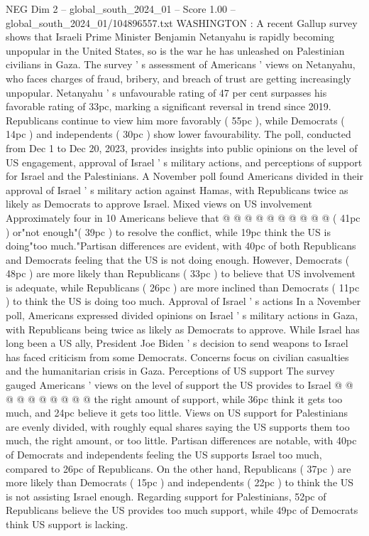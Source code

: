 \begin{textsample}{NEG Dim 2 – global\_south\_2024\_01 – Score 1.00 – global\_south\_2024\_01/104896557.txt}  \label{ex:f2_neg_345}
WASHINGTON : A recent Gallup survey shows that Israeli Prime Minister Benjamin Netanyahu is rapidly becoming unpopular in the United States, so is the war he has unleashed on Palestinian civilians in Gaza.
The survey ' s assessment of Americans ' views on Netanyahu, who faces charges of fraud, bribery, and breach of trust are getting increasingly unpopular.
Netanyahu ' s unfavourable rating of 47 per cent surpasses his favorable rating of 33pc, marking a significant reversal in trend since 2019.
Republicans continue to view him more favorably ( 55pc ), while Democrats ( 14pc ) and independents ( 30pc ) show lower favourability.
The poll, conducted from Dec 1 to Dec 20, 2023, provides insights into public opinions on the level of US engagement, approval of Israel ' s military actions, and perceptions of support for Israel and the Palestinians.
A November poll found Americans divided in their approval of Israel ' s military action against Hamas, with Republicans twice as likely as Democrats to approve Israel.
Mixed views on US involvement Approximately four in 10 Americans believe that @ @ @ @ @ @ @ @ @ @ ( 41pc ) or"not enough"( 39pc ) to resolve the conflict, while 19pc think the US is doing"too much."Partisan differences are evident, with 40pc of both Republicans and Democrats feeling that the US is not doing enough.
However, Democrats ( 48pc ) are more likely than Republicans ( 33pc ) to believe that US involvement is adequate, while Republicans ( 26pc ) are more inclined than Democrats ( 11pc ) to think the US is doing too much.
Approval of Israel ' s actions In a November poll, Americans expressed divided opinions on Israel ' s military actions in Gaza, with Republicans being twice as likely as Democrats to approve.
While Israel has long been a US ally, President Joe Biden ' s decision to send weapons to Israel has faced criticism from some Democrats.
Concerns focus on civilian casualties and the humanitarian crisis in Gaza.
Perceptions of US support The survey gauged Americans ' views on the level of support the US provides to Israel @ @ @ @ @ @ @ @ @ @ the right amount of support, while 36pc think it gets too much, and 24pc believe it gets too little.
Views on US support for Palestinians are evenly divided, with roughly equal shares saying the US supports them too much, the right amount, or too little.
Partisan differences are notable, with 40pc of Democrats and independents feeling the US supports Israel too much, compared to 26pc of Republicans.
On the other hand, Republicans ( 37pc ) are more likely than Democrats ( 15pc ) and independents ( 22pc ) to think the US is not assisting Israel enough.
Regarding support for Palestinians, 52pc of Republicans believe the US provides too much support, while 49pc of Democrats think US support is lacking.

\end{textsample}
